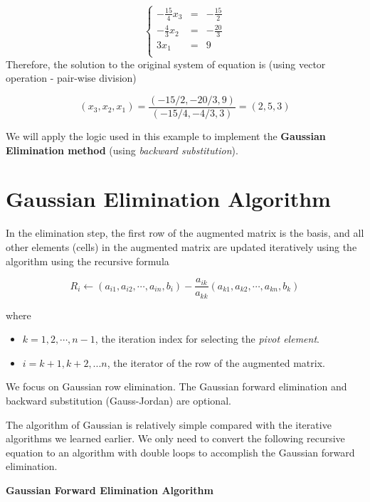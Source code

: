 \documentclass[
]{book}
\begin{document}
\[
\left\{
\begin{array}{ccc} 
 -\frac{15}{4}x_3 & = & -\frac{15}{2}\\ 
  -\frac{4}{3}x_2 &  = & -\frac{20}{3}\\ 
   3x_1 & = & 9\\ 
\end{array}
\right.
\]
Therefore, the solution to the original system of equation is (using vector operation - pair-wise division)

\[
(x_3, x_2, x_1) = \frac{(-15/2, -20/3, 9)}{(-15/4, -4/3, 3)} = (2,5,3)
\]

We will apply the logic used in this example to implement the \textbf{Gaussian Elimination method} (using \emph{backward substitution}).

\hfill\break

\hypertarget{gaussian-elimination-algorithm}{%
\section{Gaussian Elimination Algorithm}\label{gaussian-elimination-algorithm}}

In the elimination step, the first row of the augmented matrix is the basis, and all other elements (cells) in the augmented matrix are updated iteratively using the algorithm using the recursive formula

\[
R_i \leftarrow (a_{i1}, a_{i2}, \cdots, a_{in}, b_i) - \frac{a_{ik}}{a_{kk}}(a_{k1}, a_{k2}, \cdots, a_{kn}, b_k)   
\]

where

\begin{itemize}
\item
  \(k = 1, 2, \cdots, n-1\), the iteration index for selecting the \emph{pivot element}.
\item
  \(i = k+1, k+2, ...n\), the iterator of the row of the augmented matrix.
\end{itemize}

\hfill\break

We focus on Gaussian row elimination. The Gaussian forward elimination and backward substitution (Gauss-Jordan) are optional.

The algorithm of Gaussian is relatively simple compared with the iterative algorithms we learned earlier. We only need to convert the following recursive equation to an algorithm with double loops to accomplish the Gaussian forward elimination.

\textbf{Gaussian Forward Elimination Algorithm}
\end{document}
